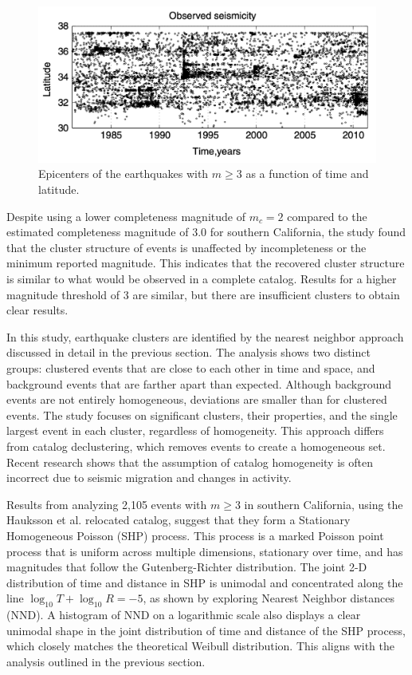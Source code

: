 \documentclass[12pt]{article} %
\theoremstyle{plain}
\begin{document}
	
	\begin{figure}[b]
		\centering
		\includegraphics[width=0.7\linewidth]{Thesis_Figures,Images,Tables/observed_seismicity}
		\caption{Epicenters of the earthquakes with $m \geq 3$ as a function of time and latitude.}
		\label{fig:observedseismicity}
	\end{figure}
	
	
	Despite using a lower completeness magnitude of $m_c=2$ compared to the estimated completeness magnitude of 3.0 for southern California, the study found that the cluster structure of events is unaffected by incompleteness or the minimum reported magnitude. This indicates that the recovered cluster structure is similar to what would be observed in a complete catalog. Results for a higher magnitude threshold of 3 are similar, but there are insufficient clusters to obtain clear results.
	
	
	
	In this study, earthquake clusters are identified by the nearest neighbor approach discussed in detail in the previous section. The analysis shows two distinct groups: clustered events that are close to each other in time and space, and background events that are farther apart than expected. Although background events are not entirely homogeneous, deviations are smaller than for clustered events. The study focuses on significant clusters, their properties, and the single largest event in each cluster, regardless of homogeneity. This approach differs from catalog declustering, which removes events to create a homogeneous set. Recent research shows that the assumption of catalog homogeneity is often incorrect due to seismic migration and changes in activity.
	
	Results from analyzing 2,105 events with $m \geq 3$ in southern California, using the Hauksson et al. relocated catalog, suggest that they form a Stationary Homogeneous Poisson (SHP) process. This process is a marked Poisson point process that is uniform across multiple dimensions, stationary over time, and has magnitudes that follow the Gutenberg-Richter distribution. The joint 2-D distribution of time and distance in SHP is unimodal and concentrated along the line $\log_{10}T+\log_{10}R=-5$, as shown by exploring Nearest Neighbor distances (NND). A histogram of NND on a logarithmic scale also displays a clear unimodal shape in the joint distribution of time and distance of the SHP process, which closely matches the theoretical Weibull distribution. This aligns with the analysis outlined in the previous section.
	
\end{document}

